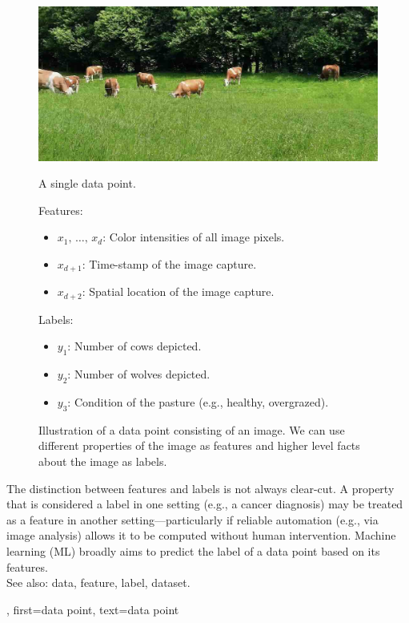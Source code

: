 {{{\begin{figure}[H]
    			\begin{minipage}[t]{0.95\textwidth}
        			\centering
        			\includegraphics[width=\textwidth]{assets/CowsAustria.jpg}
        			\caption*{A single data point.}
        			\vspace{5mm}
    			\end{minipage}
    			
    			\begin{minipage}[t]{0.95\textwidth}
        			Features:
        			\begin{itemize}
            			\item $x_{1}, \,\ldots, \,x_{d}$: Color intensities of all image pixels.
            			\item $x_{d+1}$: Time-stamp of the image capture.
            			\item $x_{d+2}$: Spatial location of the image capture.
			\end{itemize}
			Labels:
            		\begin{itemize}
               	 		\item $y_{1}$: Number of cows depicted. 
                			\item $y_{2}$: Number of wolves depicted. 
                			\item $y_{3}$: Condition of the pasture (e.g., healthy, overgrazed).
            		\end{itemize}
    			\end{minipage}
    			\caption{Illustration of a data point consisting of an image. We can use 
			different properties of the image as features and higher level facts
			about the image as labels.\label{fig:datapoint_cowherd_dict}}
		\end{figure}
 		The distinction between features and labels is not always clear-cut. 
 		A property that is considered a label in one setting (e.g., a cancer diagnosis) 
 		may be treated as a feature in another setting—particularly if reliable automation (e.g., 
 		via image analysis) allows it to be computed without human intervention.
   		Machine learning (ML) broadly aims to predict the label of a data point based on its features. 
				\\
		See also: data, feature, label, dataset.}, 
	first={data point},
	text={data point}  
}


}
